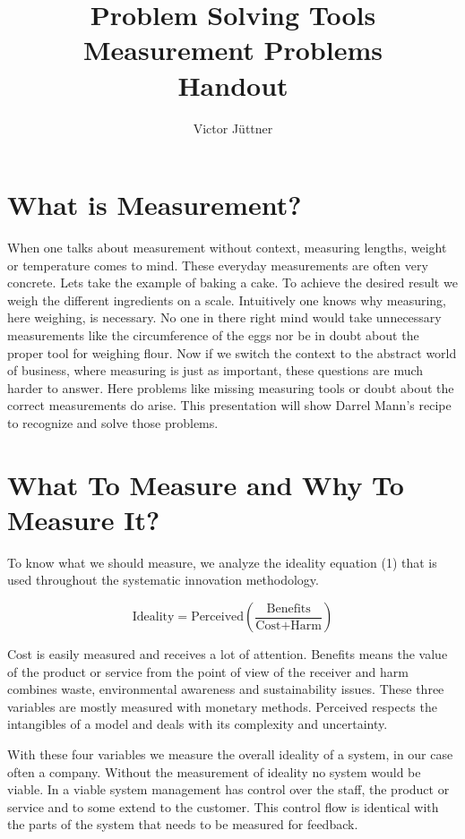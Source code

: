 \documentclass[12pt,a4paper]{article}
\author{Victor Jüttner}
\title{Problem Solving Tools \\ \textbf{Measurement Problems} \\ \vspace{5mm} \large Handout}
\begin{document}
\maketitle


\section{What is Measurement?}
When one talks about measurement without context, measuring lengths, weight or temperature comes to mind. These everyday measurements are often very concrete. Lets take the example of baking a cake. To achieve the desired result we weigh the different ingredients on a scale. Intuitively one knows why measuring, here weighing, is necessary. No one in there right mind would take unnecessary measurements like the circumference of the eggs nor be in doubt about the proper tool for weighing flour. Now if we switch the context to the abstract world of business, where measuring is just as important, these questions are much harder to answer.
Here problems like missing measuring tools or doubt about the correct measurements do arise. This presentation will show Darrel Mann's recipe to recognize and solve those problems.


\section{What To Measure and Why To Measure It?}
To know what we should measure, we analyze the ideality equation (1) that is used throughout the systematic innovation methodology.

\begin{equation}
	 \text{Ideality} = \text{Perceived} \left(\frac{\text{Benefits}}{\text{Cost} + \text{Harm}}\right)
\end{equation}

Cost is easily measured and receives a lot of attention. Benefits means the value of the product or service from the point of view of the receiver and harm combines waste, environmental awareness and sustainability issues. These three variables are mostly measured with monetary methods. Perceived respects the intangibles of a model and deals with its complexity and uncertainty.

With these four variables we measure the overall ideality of a system, in our case often a company. Without the measurement of ideality no system would be viable. In a viable system management has control over the staff, the product or service and to some extend to the customer. This control flow is identical with the parts of the system that needs to be measured for feedback.
\end{document}
